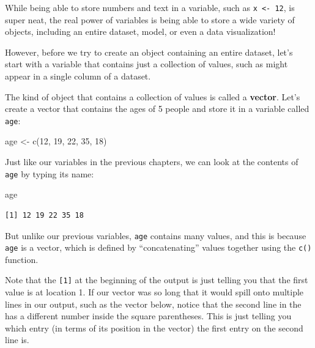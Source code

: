 \documentclass[
  letterpaper,
  DIV=11,
  numbers=noendperiod]{scrreprt}
\newenvironment{Shaded}{\begin{snugshade}}{\end{snugshade}}
\newcommand{\DecValTok}[1]{\textcolor[rgb]{0.68,0.00,0.00}{#1}}
\newcommand{\FunctionTok}[1]{\textcolor[rgb]{0.28,0.35,0.67}{#1}}
\newcommand{\NormalTok}[1]{\textcolor[rgb]{0.00,0.23,0.31}{#1}}
\newcommand{\OtherTok}[1]{\textcolor[rgb]{0.00,0.23,0.31}{#1}}
\begin{document}
While being able to store numbers and text in a variable, such as
\texttt{x\ \textless{}-\ 12}, is super neat, the real power of variables
is being able to store a wide variety of objects, including an entire
dataset, model, or even a data visualization!

However, before we try to create an object containing an entire dataset,
let's start with a variable that contains just a collection of values,
such as might appear in a single column of a dataset.

The kind of object that contains a collection of values is called a
\textbf{vector}. Let's create a vector that contains the ages of 5
people and store it in a variable called \texttt{age}:

\begin{Shaded}
\begin{Highlighting}[]
\NormalTok{age }\OtherTok{\textless{}{-}} \FunctionTok{c}\NormalTok{(}\DecValTok{12}\NormalTok{, }\DecValTok{19}\NormalTok{, }\DecValTok{22}\NormalTok{, }\DecValTok{35}\NormalTok{, }\DecValTok{18}\NormalTok{)}
\end{Highlighting}
\end{Shaded}

Just like our variables in the previous chapters, we can look at the
contents of \texttt{age} by typing its name:

\begin{Shaded}
\begin{Highlighting}[]
\NormalTok{age}
\end{Highlighting}
\end{Shaded}

\begin{verbatim}
[1] 12 19 22 35 18
\end{verbatim}

But unlike our previous variables, \texttt{age} contains many values,
and this is because \texttt{age} is a vector, which is defined by
``concatenating'' values together using the \texttt{c()} function.

Note that the \texttt{{[}1{]}} at the beginning of the output is just
telling you that the first value is at location 1. If our vector was so
long that it would spill onto multiple lines in our output, such as the
vector below, notice that the second line in the has a different number
inside the square parentheses. This is just telling you which entry (in
terms of its position in the vector) the first entry on the second line
is.
\end{document}
